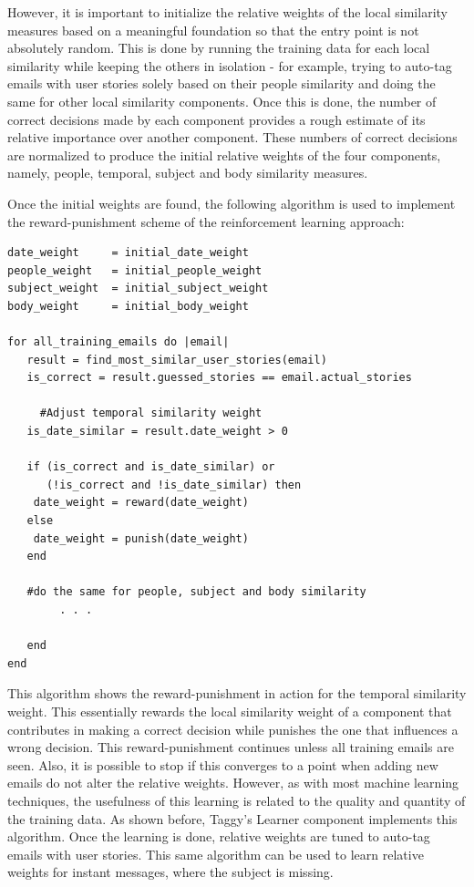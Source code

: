 However, it is important to initialize the relative weights of the local similarity measures based on a meaningful foundation so that the entry point is not absolutely random. This is done by running the training data for each local similarity while keeping the others in isolation - for example, trying to auto-tag emails with user stories solely based on their people similarity and doing the same for other local similarity components. Once this is done, the number of correct decisions made by each component provides a rough estimate of its relative importance over another component. These numbers of correct decisions are normalized to produce the initial relative weights of the four components, namely, people, temporal, subject and body similarity measures.

Once the initial weights are found, the following algorithm is used to implement the reward-punishment scheme of the reinforcement learning approach:

\pagebreak
\begin{verbatim}
date_weight     = initial_date_weight
people_weight   = initial_people_weight
subject_weight  = initial_subject_weight
body_weight     = initial_body_weight

for all_training_emails do |email|
   result = find_most_similar_user_stories(email)
   is_correct = result.guessed_stories == email.actual_stories

	 #Adjust temporal similarity weight
   is_date_similar = result.date_weight > 0

   if (is_correct and is_date_similar) or 
      (!is_correct and !is_date_similar) then
    date_weight = reward(date_weight)
   else
    date_weight = punish(date_weight)
   end

   #do the same for people, subject and body similarity
		. . .
		
   end
end
\end{verbatim}
This algorithm shows the reward-punishment in action for the temporal similarity weight. This essentially rewards the local similarity weight of a component that contributes in making a correct decision while punishes the one that influences a wrong decision. This reward-punishment continues unless all training emails are seen. Also, it is possible to stop if this converges to a point when adding new emails do not alter the relative weights. However, as with most machine learning techniques, the usefulness of this learning is related to the quality and quantity of the training data. As shown before, Taggy's Learner component implements this algorithm. Once the learning is done, relative weights are tuned to auto-tag emails with user stories. This same algorithm can be used to learn relative weights for instant messages, where the subject is missing.

